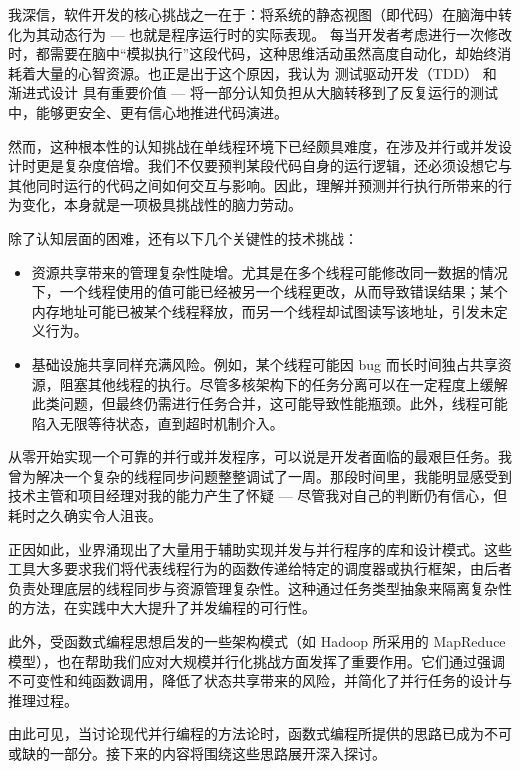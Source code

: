 我深信，软件开发的核心挑战之一在于：将系统的静态视图（即代码）在脑海中转化为其动态行为 --- 也就是程序运行时的实际表现。 每当开发者考虑进行一次修改时，都需要在脑中“模拟执行”这段代码，这种思维活动虽然高度自动化，却始终消耗着大量的心智资源。也正是出于这个原因，我认为 测试驱动开发（TDD） 和 渐进式设计 具有重要价值 --- 将一部分认知负担从大脑转移到了反复运行的测试中，能够更安全、更有信心地推进代码演进。

然而，这种根本性的认知挑战在单线程环境下已经颇具难度，在涉及并行或并发设计时更是复杂度倍增。我们不仅要预判某段代码自身的运行逻辑，还必须设想它与其他同时运行的代码之间如何交互与影响。因此，理解并预测并行执行所带来的行为变化，本身就是一项极具挑战性的脑力劳动。

除了认知层面的困难，还有以下几个关键性的技术挑战：

\begin{itemize}
\item 
资源共享带来的管理复杂性陡增。尤其是在多个线程可能修改同一数据的情况下，一个线程使用的值可能已经被另一个线程更改，从而导致错误结果；某个内存地址可能已被某个线程释放，而另一个线程却试图读写该地址，引发未定义行为。

\item 
基础设施共享同样充满风险。例如，某个线程可能因 bug 而长时间独占共享资源，阻塞其他线程的执行。尽管多核架构下的任务分离可以在一定程度上缓解此类问题，但最终仍需进行任务合并，这可能导致性能瓶颈。此外，线程可能陷入无限等待状态，直到超时机制介入。
\end{itemize}

从零开始实现一个可靠的并行或并发程序，可以说是开发者面临的最艰巨任务。我曾为解决一个复杂的线程同步问题整整调试了一周。那段时间里，我能明显感受到技术主管和项目经理对我的能力产生了怀疑 --- 尽管我对自己的判断仍有信心，但耗时之久确实令人沮丧。

正因如此，业界涌现出了大量用于辅助实现并发与并行程序的库和设计模式。这些工具大多要求我们将代表线程行为的函数传递给特定的调度器或执行框架，由后者负责处理底层的线程同步与资源管理复杂性。这种通过任务类型抽象来隔离复杂性的方法，在实践中大大提升了并发编程的可行性。

此外，受函数式编程思想启发的一些架构模式（如 Hadoop 所采用的 MapReduce 模型），也在帮助我们应对大规模并行化挑战方面发挥了重要作用。它们通过强调不可变性和纯函数调用，降低了状态共享带来的风险，并简化了并行任务的设计与推理过程。

由此可见，当讨论现代并行编程的方法论时，函数式编程所提供的思路已成为不可或缺的一部分。接下来的内容将围绕这些思路展开深入探讨。
